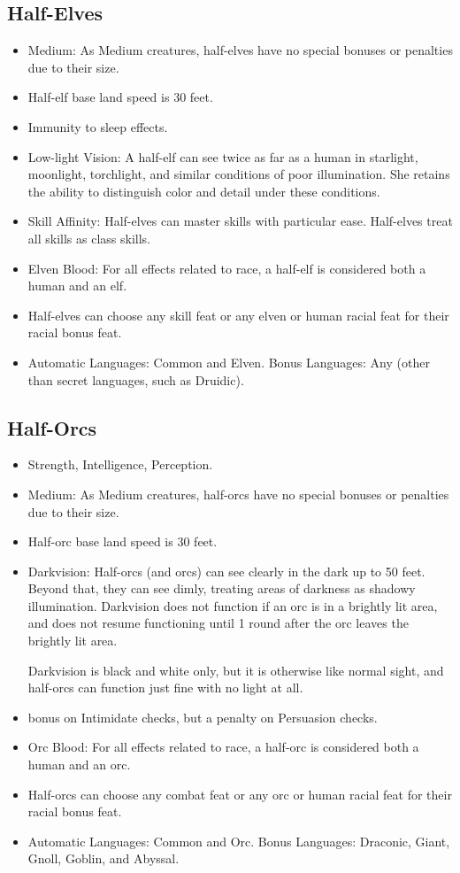 \subsection{Half-Elves}
\begin{itemize}
\item Medium: As Medium creatures, half-elves have no special bonuses or penalties due to their size.
\item Half-elf base land speed is 30 feet.
\item Immunity to sleep effects.
\item Low-light Vision: A half-elf can see twice as far as a human in starlight, moonlight, torchlight, and similar conditions of poor illumination. She retains the ability to distinguish color and detail under these conditions.
 \item Skill Affinity: Half-elves can master skills with particular ease. Half-elves treat all skills as class skills.
\item Elven Blood: For all effects related to race, a half-elf is considered both a human and an elf.
\item Half-elves can choose any skill feat or any elven or human racial feat for their racial bonus feat.
\item Automatic Languages: Common and Elven. Bonus Languages: Any (other than secret languages, such as Druidic).
\end{itemize}

\subsection{Half-Orcs}
\begin{itemize}
\item {} Strength,  Intelligence,  Perception.
\item Medium: As Medium creatures, half-orcs have no special bonuses or penalties due to their size.
\item Half-orc base land speed is 30 feet.
\item Darkvision: Half-orcs (and orcs) can see clearly in the dark up to 50 feet.  Beyond that, they can see dimly, treating areas of darkness as shadowy illumination. Darkvision does not function if an orc is in a brightly lit area, and does not resume functioning until 1 round after the orc leaves the brightly lit area.
\par Darkvision is black and white only, but it is otherwise like normal sight, and half-orcs can function just fine with no light at all.
\item {} bonus on Intimidate checks, but a  penalty on Persuasion checks.
\item Orc Blood: For all effects related to race, a half-orc is considered both a human and an orc.
\item Half-orcs can choose any combat feat or any orc or human racial feat for their racial bonus feat.
\item Automatic Languages: Common and Orc. Bonus Languages: Draconic, Giant, Gnoll, Goblin, and Abyssal.
\end{itemize}

